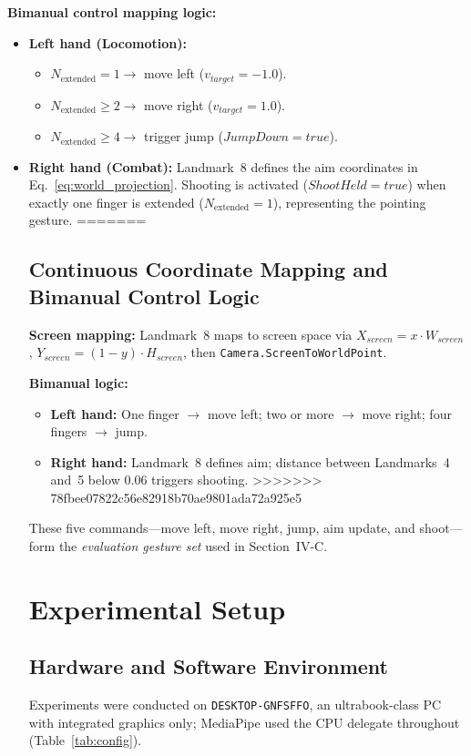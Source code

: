 \documentclass[journal,onecolumn,12pt,draftclsnofoot]{IEEEtran}
\begin{document}
\textbf{Bimanual control mapping logic:}
\begin{itemize}
\item \textbf{Left hand (Locomotion):} 
  \begin{itemize}
      \item $N_{\text{extended}} = 1 \rightarrow$ move left ($v_{target} = -1.0$).
      \item $N_{\text{extended}} \geq 2 \rightarrow$ move right ($v_{target} = 1.0$).
      \item $N_{\text{extended}} \geq 4 \rightarrow$ trigger jump ($JumpDown = true$).
  \end{itemize}
\item \textbf{Right hand (Combat):} Landmark~8 defines the aim coordinates in Eq.~\ref{eq:world_projection}. Shooting is activated ($ShootHeld = true$) when exactly one finger is extended ($N_{\text{extended}} = 1$), representing the pointing gesture.
=======
\subsection{Continuous Coordinate Mapping and Bimanual Control Logic}
\textbf{Screen mapping:} Landmark~8 maps to screen space via $X_{screen}=x\cdot W_{screen}$, $Y_{screen}=(1-y)\cdot H_{screen}$, then \texttt{Camera.ScreenToWorldPoint}.

\textbf{Bimanual logic:}
\begin{itemize}
\item \textbf{Left hand:} One finger $\rightarrow$ move left; two or more $\rightarrow$ move right; four fingers $\rightarrow$ jump.
\item \textbf{Right hand:} Landmark~8 defines aim; distance between Landmarks~4 and~5 below 0.06 triggers shooting.
>>>>>>> 78fbee07822c56e82918b70ae9801ada72a925e5
\end{itemize}

These five commands---move left, move right, jump, aim update, and shoot---form the \textit{evaluation gesture set} used in Section~IV-C.

\section{Experimental Setup}

\subsection{Hardware and Software Environment}
Experiments were conducted on \texttt{DESKTOP-GNFSFFO}, an ultrabook-class PC with integrated graphics only; MediaPipe used the CPU delegate throughout (Table~\ref{tab:config}).


\end{itemize}
\end{document}
